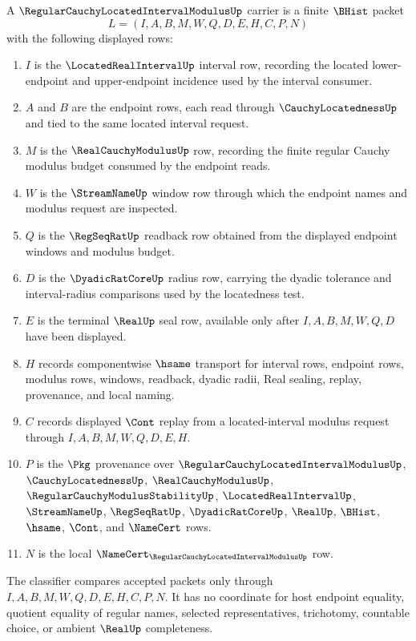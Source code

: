 \begin{definition}
\label{def:regular-cauchy-located-interval-modulus-carrier}
A $\RegularCauchyLocatedIntervalModulusUp$ carrier is a finite $\BHist$ packet
$$
L=(I,A,B,M,W,Q,D,E,H,C,P,N)
$$
with the following displayed rows:
\begin{enumerate}
\item $I$ is the $\LocatedRealIntervalUp$ interval row, recording the located lower-endpoint and upper-endpoint incidence used by the interval consumer.
\item $A$ and $B$ are the endpoint rows, each read through $\CauchyLocatednessUp$ and tied to the same located interval request.
\item $M$ is the $\RealCauchyModulusUp$ row, recording the finite regular Cauchy modulus budget consumed by the endpoint reads.
\item $W$ is the $\StreamNameUp$ window row through which the endpoint names and modulus request are inspected.
\item $Q$ is the $\RegSeqRatUp$ readback row obtained from the displayed endpoint windows and modulus budget.
\item $D$ is the $\DyadicRatCoreUp$ radius row, carrying the dyadic tolerance and interval-radius comparisons used by the locatedness test.
\item $E$ is the terminal $\RealUp$ seal row, available only after $I,A,B,M,W,Q,D$ have been displayed.
\item $H$ records componentwise $\hsame$ transport for interval rows, endpoint rows, modulus rows, windows, readback, dyadic radii, Real sealing, replay, provenance, and local naming.
\item $C$ records displayed $\Cont$ replay from a located-interval modulus request through $I,A,B,M,W,Q,D,E,H$.
\item $P$ is the $\Pkg$ provenance over $\RegularCauchyLocatedIntervalModulusUp$, $\CauchyLocatednessUp$, $\RealCauchyModulusUp$, $\RegularCauchyModulusStabilityUp$, $\LocatedRealIntervalUp$, $\StreamNameUp$, $\RegSeqRatUp$, $\DyadicRatCoreUp$, $\RealUp$, $\BHist$, $\hsame$, $\Cont$, and $\NameCert$ rows.
\item $N$ is the local $\NameCert_{\RegularCauchyLocatedIntervalModulusUp}$ row.
\end{enumerate}
The classifier compares accepted packets only through $I,A,B,M,W,Q,D,E,H,C,P,N$. It has no coordinate for host endpoint equality, quotient equality of regular names, selected representatives, trichotomy, countable choice, or ambient $\RealUp$ completeness.
\end{definition}

